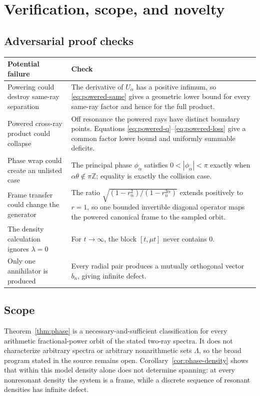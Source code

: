 \documentclass[11pt]{article}
\theoremstyle{definition}
\newcommand{\Lam}{\Lambda}
\begin{document}
\section{Verification, scope, and novelty}

\subsection*{Adversarial proof checks}

\begin{center}
\begin{tabular}{@{}>{\raggedright\arraybackslash}p{}
>{\raggedright\arraybackslash}p{}@{}}
\toprule
Potential failure & Check \\
\midrule
Powering could destroy same-ray separation &
The derivative of \(U_\alpha\) has a positive infimum, so
\eqref{eq:powered-same} gives a geometric lower bound for every same-ray
factor and hence for the full product. \\
Powered cross-ray product could collapse &
Off resonance the powered rays have distinct boundary points.
Equations \eqref{eq:powered-q}--\eqref{eq:powered-loss} give a common
factor lower bound and uniformly summable deficits. \\
Phase wrap could create an unlisted case &
The principal phase \(\phi_\alpha\) satisfies
\(0<|\phi_\alpha|<\pi\) exactly when
\(\alpha\theta\notin\pi\mathbb Z\); equality is exactly the collision
case. \\
Frame transfer could change the generator &
The ratio
\(\sqrt{(1-r_n^2)/(1-r_n^{2\alpha})}\) extends positively to \(r=1\),
so one bounded invertible diagonal operator maps the powered canonical
frame to the sampled orbit. \\
The density calculation ignores \(\lambda=0\) &
For \(t\to\infty\), the block \([t,\mu t]\) never contains \(0\). \\
Only one annihilator is produced &
Every radial pair produces a mutually orthogonal vector \(b_n\), giving
infinite defect. \\
\bottomrule
\end{tabular}
\end{center}

\subsection*{Scope}

Theorem~\ref{thm:phase} is a necessary-and-sufficient classification for
every arithmetic fractional-power orbit of the stated two-ray spectra.
It does not characterize arbitrary spectra or arbitrary nonarithmetic
sets \(\Lam\), so the broad program stated in the source remains open.
Corollary~\ref{cor:phase-density} shows that within this model density
alone does not determine spanning: at every nonresonant density the
system is a frame, while a discrete sequence of resonant densities has
infinite defect.
\end{document}
